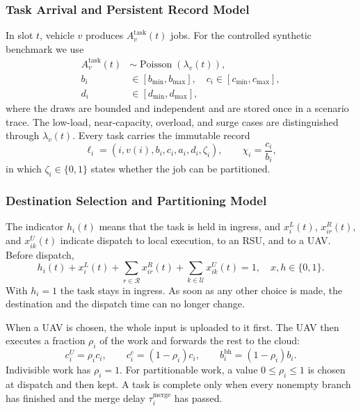 \subsubsection{Task Arrival and Persistent Record Model}
In slot $t$, vehicle $v$ produces $A_v^{\mathrm{task}}(t)$ jobs. For the
controlled synthetic benchmark we use
\begin{equation}
\begin{aligned}
A_v^{\mathrm{task}}(t)&\sim
\operatorname{Poisson}(\lambda_v(t)),\\
b_i&\in[b_{\min},b_{\max}],\quad
c_i\in[c_{\min},c_{\max}],\\
d_i&\in[d_{\min},d_{\max}],
\end{aligned}
\label{eq:task_arrival}
\end{equation}
where the draws are bounded and independent and are stored once in a
scenario trace. The low-load, near-capacity, overload, and surge cases are
distinguished through $\lambda_v(t)$. Every task carries the immutable record
\begin{equation}
\ell_i=(i,v(i),b_i,c_i,a_i,d_i,\zeta_i),\qquad
\chi_i=\frac{c_i}{b_i},
\label{eq:task_record}
\end{equation}
in which $\zeta_i\in\{0,1\}$ states whether the job can be partitioned.

\subsubsection{Destination Selection and Partitioning Model}
The indicator $h_i(t)$ means that the task is held in ingress, and $x_i^L(t)$,
$x_{ir}^R(t)$, and $x_{ik}^U(t)$ indicate dispatch to local execution, to an
RSU, and to a UAV. Before dispatch,
\begin{equation}
h_i(t)+x_i^L(t)+\sum_{r\in\mathcal R}x_{ir}^R(t)
 +\sum_{k\in\mathcal U}x_{ik}^U(t)=1,
\quad x,h\in\{0,1\}.
\label{eq:destination}
\end{equation}
With $h_i=1$ the task stays in ingress. As soon as any other choice is made,
the destination and the dispatch time can no longer change.

When a UAV is chosen, the whole input is uploaded to it first. The UAV then
executes a fraction $\rho_i$ of the work and forwards the rest to the cloud:
\begin{equation}
c_i^U=\rho_i c_i,\qquad
c_i^c=(1-\rho_i)c_i,\qquad
b_i^{\mathrm{bh}}=(1-\rho_i)b_i.
\label{eq:split}
\end{equation}
Indivisible work has $\rho_i=1$. For partitionable work, a value
$0\le\rho_i\le1$ is chosen at dispatch and then kept. A task is complete only
when every nonempty branch has finished and the merge delay
$\tau_i^{\mathrm{merge}}$ has passed.

